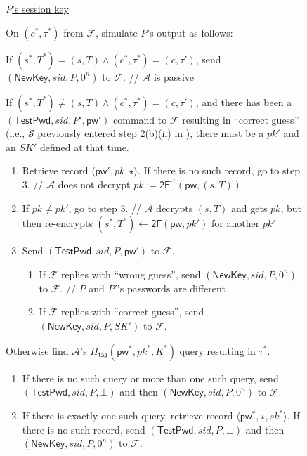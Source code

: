 \documentclass{article}
\theoremstyle{plain}
\theoremstyle{definition}
\theoremstyle{remark}
\newcommand{\adv}{\mathcal{A}}
\renewcommand{\sim}{\mathcal{S}}
\newcommand{\func}{\mathcal{F}}
\newcommand{\Htag}{H_\mathsf{tag}}
\newcommand{\pw}{\mathsf{pw}}
\newcommand{\TestPwd}{\mathsf{TestPwd}}
\newcommand{\NewKey}{\mathsf{NewKey}}
\begin{document}
\begin{figure}[H]
\begin{framed}
\begin{small}
\underline{$P$'s session key}

\medskip
On $(c^*,\tau^*)$ from $\func$, simulate $P$'s output as follows:
\begin{enumerate}
  \item If $(s^*,T^*) = (s,T) \land (c^*,\tau^*) = (c,\tau')$, send $(\NewKey, sid, P, 0^n)$ to $\func$. \quad \textcolor[gray]{0.5}{// $\adv$ is passive}
  {\color{blue}\item If $(s^*,T^*) \neq (s,T) \land (c^*,\tau^*) = (c,\tau')$, and there has been a $(\TestPwd, sid, P', \pw')$ command to $\func$ resulting in ``correct guess'' (i.e., $\sim$ previously entered step 2(b)(ii) in ), there must be a $pk'$ and an $SK'$ defined at that time. 
      \begin{enumerate}
        \item Retrieve record $\langle\pw',pk,\star\rangle$. If there is no such record, go to step 3. \quad \textcolor[gray]{0.5}{// $\adv$ does not decrypt $pk := \mathsf{2F}^{\text{-}1}(\pw,(s,T))$}
        \item If $pk \neq pk'$, go to step 3. \quad \textcolor[gray]{0.5}{// $\adv$ decrypts $(s,T)$ and gets $pk$, but then re-encrypts $(s^*,T^*) \gets \mathsf{2F}(\pw,pk')$ for another $pk'$}
        \item Send $(\TestPwd, sid, P, \pw')$ to $\func$.
            \begin{enumerate}
              \item If $\func$ replies with ``wrong guess'', send $(\NewKey, sid, P, 0^n)$ to $\func$. \quad \textcolor[gray]{0.5}{// $P$ and $P'$'s passwords are different}
              \item If $\func$ replies with ``correct guess'', send $(\NewKey, sid, P, SK')$ to $\func$.
            \end{enumerate}
      \end{enumerate}
  }
  \item Otherwise find $\adv$'s {\color{blue}$\Htag(\pw^*,pk^*,K^*)$} query resulting in $\tau^*$.
      \begin{enumerate}
        \item If there is no such query or more than one such query, send $(\TestPwd, sid, P, \bot)$ and then $(\NewKey, sid, P, 0^n)$ to $\func$.
        \item If there is exactly one such query, retrieve record $\langle\pw^*,\star,sk^*\rangle$. If there is no such record, send $(\TestPwd, sid, P, \bot)$ and then $(\NewKey, sid, P, 0^n)$ to $\func$.

\end{enumerate}
\end{enumerate}
\end{small}
\end{framed}
\end{figure}
\end{document}
